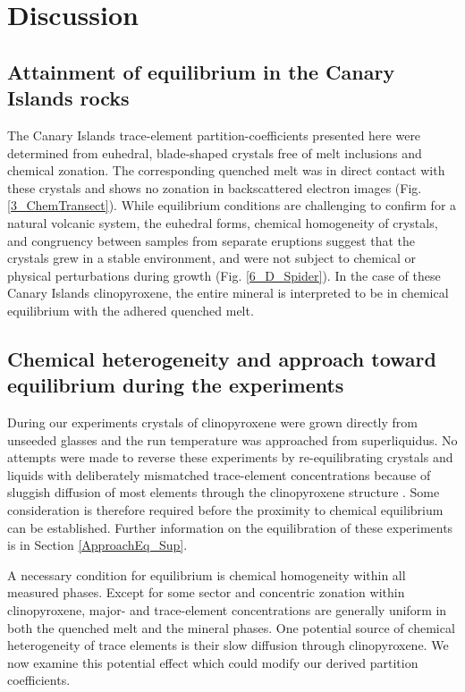 \documentclass[review,authoryear,12pt]{elsarticle}
\begin{document}
\section{Discussion}
\subsection{Attainment of equilibrium in the Canary Islands rocks}
The Canary Islands trace-element partition-coefficients presented here were determined from euhedral, blade-shaped crystals free of melt inclusions and chemical zonation. The corresponding quenched melt was in direct contact with these crystals and shows no zonation in backscattered electron images (Fig. \ref{3_ChemTransect}). While equilibrium conditions are challenging to confirm for a natural volcanic system, the euhedral forms, chemical homogeneity of crystals, and congruency between samples from separate eruptions suggest that the crystals grew in a stable environment, and were not subject to chemical or physical perturbations during growth (Fig. \ref{6_D_Spider}). In the case of these Canary Islands clinopyroxene, the entire mineral is interpreted to be in chemical equilibrium with the adhered quenched melt.

\subsection{Chemical heterogeneity and approach toward equilibrium during the experiments}

During our experiments crystals of clinopyroxene were grown directly from unseeded glasses and the run temperature was approached from superliquidus. No attempts were made to reverse these experiments by re-equilibrating crystals and liquids with deliberately mismatched trace-element concentrations because of sluggish diffusion of most elements through the clinopyroxene structure \citep{VanOrman2001,Cherniak2010}. Some consideration is therefore required before the proximity to chemical equilibrium can be established. Further information on the equilibration of these experiments is in Section \ref{ApproachEq_Sup}.

A necessary condition for equilibrium is chemical homogeneity within all measured phases. Except for some sector and concentric zonation within clinopyroxene, major- and trace-element concentrations are generally uniform in both the quenched melt and the mineral phases.
		One potential source of chemical heterogeneity of trace elements is their slow diffusion through clinopyroxene. We now examine this potential effect which could modify our derived partition coefficients.
\end{document}
